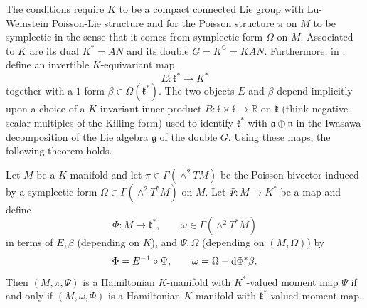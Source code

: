 \documentclass[notitlepage]{article}
\begin{document}
The conditions require $K$ to be a compact connected Lie group with Lu-Weinstein Poisson-Lie structure and for the Poisson structure $\pi$ on $M$ to be symplectic in the sense that it comes from symplectic form $\Omega$ on $M$.
Associated to $K$ are its dual $K^{*} = AN$ and its double $G = K^{\mathbb C} = KAN$. Furthermore, in \cite{alekseev2001linearization}, \citeauthor{alekseev2001linearization} define an invertible $K$-equivariant map
\begin{equation}
    E : \mathfrak k^{*} \to K^{*}
\end{equation}
together with a $1$-form $\beta \in \Omega(\mathfrak k^{*})$.
The two objects $E$ and $\beta$ depend implicitly upon a choice of a $K$-invariant inner product $B : \mathfrak k \times \mathfrak k \to \mathbb R$ on $\mathfrak k$ (think negative scalar multiples of the Killing form) used to identify $\mathfrak k^{*}$ with $\mathfrak a \oplus \mathfrak n$ in the Iwasawa decomposition of the Lie algebra $\mathfrak g$ of the double $G$.
Using these maps, the following theorem holds.

\begin{thm}[Linearization]
    Let $M$ be a $K$-manifold and let $\pi \in \Gamma(\wedge^2 TM)$ be the Poisson bivector induced by a symplectic form $\Omega \in \Gamma(\wedge^2 T^* M)$ on $M$.
    Let $\Psi : M \to K^{*}$ be a map and define 
    \begin{equation}
        \Phi : M \to \mathfrak k^{*}, \qquad \omega \in \Gamma(\wedge^2 T^* M)
    \end{equation}
    in terms of $E, \beta$ (depending on $K$), and $\Psi,\Omega$ (depending on $(M, \Omega)$) by
    \begin{equation}
        \Phi = E^{-1} \circ \Psi, \qquad \omega = \Omega - \mathrm{d} \Phi^{*} \beta.
    \end{equation}
    Then $(M, \pi, \Psi)$ is a Hamiltonian $K$-manifold with $K^*$-valued moment map $\Psi$ if and only if $(M, \omega, \Phi)$ is a Hamiltonian $K$-manifold with $\mathfrak k^{*}$-valued moment map.
\end{thm}
\end{document}
